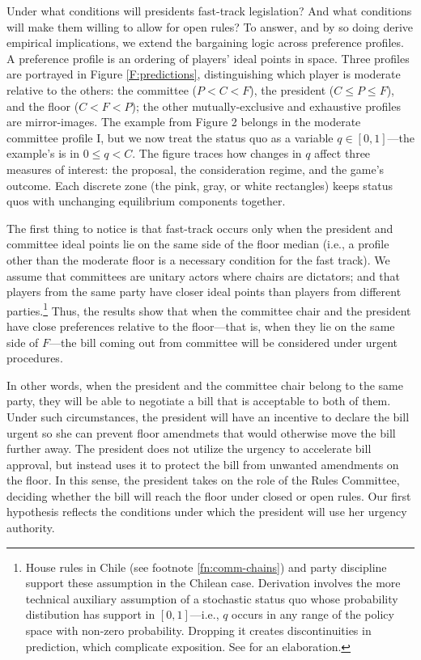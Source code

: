 \documentclass[letter,12pt]{article}
\begin{document}
Under what conditions will presidents fast-track legislation? And what conditions will make them willing to allow for open rules? To answer, and by so doing derive empirical implications, we extend the bargaining logic across preference profiles. A preference profile is an ordering of players' ideal points in space. Three profiles are portrayed in Figure \ref{F:predictions}, distinguishing which player is moderate relative to the others: the committee ($P<C<F$), the president ($C \leq P \leq F$), and the floor ($C<F<P$); the other mutually-exclusive and exhaustive profiles are mirror-images. The example from Figure 2 belongs in the moderate committee profile I, but we now treat the status quo as a variable $q \in [0,1]$---the example's is in $0 \leq q < C$. The figure traces how changes in $q$ affect three measures of interest: the proposal, the consideration regime, and the game's outcome. Each discrete zone (the pink, gray, or white rectangles) keeps status quos with unchanging equilibrium components together.

The first thing to notice is that fast-track occurs only when the president and committee ideal points lie on the same side of the floor median (i.e., a profile other than the moderate floor is a necessary condition for the fast track). We assume that committees are unitary actors where chairs are dictators; and that players from the same party have closer ideal points than players from different parties.\footnote{House rules in Chile (see footnote \ref{fn:comm-chains}) and party discipline \citep{aleman.saiegh.coalUnityChile.2007,carey.2002} support these assumption in the Chilean case. Derivation involves the more technical auxiliary assumption of a stochastic status quo whose probability distibution has support in $[0,1]$---i.e., $q$ occurs in any range of the policy space with non-zero probability. Dropping it creates discontinuities in prediction, which complicate exposition. See \citet[:38]{cox.mccubbins.2005} for an elaboration.} Thus, the results show that when the committee chair and the president have close preferences relative to the floor---that is, when they lie on the same side of $F$---the bill coming out from committee will be considered under urgent procedures. 

In other words, when the president and the committee chair belong to the same party, they will be able to negotiate a bill that is acceptable to both of them. Under such circumstances, the president will have an incentive to declare the bill urgent so she can prevent floor amendmets that would otherwise move the bill further away. The president does not utilize the urgency to accelerate bill approval, but instead uses it to protect the bill from unwanted amendments on the floor. In this sense, the president takes on the role of the Rules Committee, deciding whether the bill will reach the floor under closed or open rules. Our first hypothesis reflects the conditions under which the president will use her urgency authority.
\end{document}
